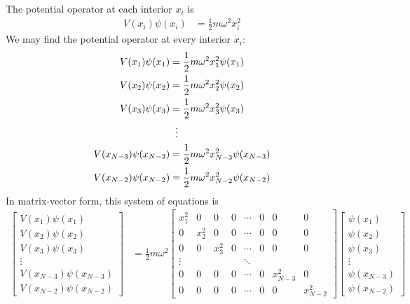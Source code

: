 The potential operator at each interior $x_i$ is
\begin{align*}
    V(x_i)\psi(x_i) &= \frac{1}{2} m \omega^2 x_i^2
\end{align*}
%
We may find the potential operator at every interior $x_i$:
\begin{align*}
    V(x_1)\psi(x_1) &= \frac{1}{2} m \omega^2 x_1^2 \psi(x_1)\\
    V(x_2)\psi(x_2) &= \frac{1}{2} m \omega^2 x_2^2 \psi(x_2) \\
    V(x_3)\psi(x_3) &= \frac{1}{2} m \omega^2 x_3^2 \psi(x_3) \\
    &\hspace{2mm}\vdots \\
    V(x_{N-3})\psi(x_{N-3}) &= \frac{1}{2} m \omega^2 x_{N-3}^2 \psi(x_{N-3}) \\
    V(x_{N-2})\psi(x_{N-2}) &= \frac{1}{2} m \omega^2 x_{N-2}^2 \psi(x_{N-2})
\end{align*}
%
In matrix-vector form, this system of equations is
\begin{align*}
\begin{bmatrix}
    V(x_1)\psi(x_1) \\
    V(x_2)\psi(x_2) \\
    V(x_3)\psi(x_3) \\
    \vdots \\
    V(x_{N-3})\psi(x_{N-3}) \\
    V(x_{N-2})\psi(x_{N-2})
\end{bmatrix}
&=
\frac{1}{2} m \omega^2
\begin{bmatrix}
    x_1^2 & 0 & 0 & 0 & \cdots & 0 & 0 & 0 \\
    0 & x_2^2 & 0 & 0 & \cdots & 0 & 0 & 0 \\
    0 & 0 & x_3^2 & 0 & \cdots & 0 & 0 & 0 \\
    \vdots & & & & \ddots & & \\
    0 & 0 & 0 & 0 & \cdots & 0 & x_{N-3}^2 & 0 \\
    0 & 0 & 0 & 0 & \cdots & 0 & 0 & x_{N-2}^2
\end{bmatrix}
\begin{bmatrix}
    \psi(x_1) \\ \psi(x_2) \\ \psi(x_3) \\ \vdots \\ \psi(x_{N-3}) \\ \psi(x_{N-2})
\end{bmatrix}
\end{align*}

